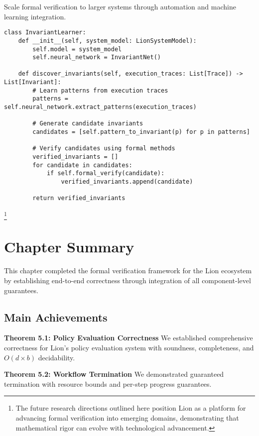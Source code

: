 Scale formal verification to larger systems through automation and machine learning integration.

\begin{lstlisting}[style=python,caption={ML-Assisted Invariant Discovery}]
class InvariantLearner:
    def __init__(self, system_model: LionSystemModel):
        self.model = system_model
        self.neural_network = InvariantNet()
    
    def discover_invariants(self, execution_traces: List[Trace]) -> List[Invariant]:
        # Learn patterns from execution traces
        patterns = self.neural_network.extract_patterns(execution_traces)
        
        # Generate candidate invariants
        candidates = [self.pattern_to_invariant(p) for p in patterns]
        
        # Verify candidates using formal methods
        verified_invariants = []
        for candidate in candidates:
            if self.formal_verify(candidate):
                verified_invariants.append(candidate)
        
        return verified_invariants
\end{lstlisting}\footnote{The future research directions outlined here position Lion as a platform for advancing formal verification into emerging domains, demonstrating that mathematical rigor can evolve with technological advancement.}

\newpage

\section{Chapter Summary}

This chapter completed the formal verification framework for the Lion ecosystem by establishing end-to-end correctness through integration of all component-level guarantees.

\subsection{Main Achievements}

\textbf{Theorem 5.1: Policy Evaluation Correctness}
We established comprehensive correctness for Lion's policy evaluation system with soundness, completeness, and $O(d \times b)$ decidability.

\textbf{Theorem 5.2: Workflow Termination}
We demonstrated guaranteed termination with resource bounds and per-step progress guarantees.

